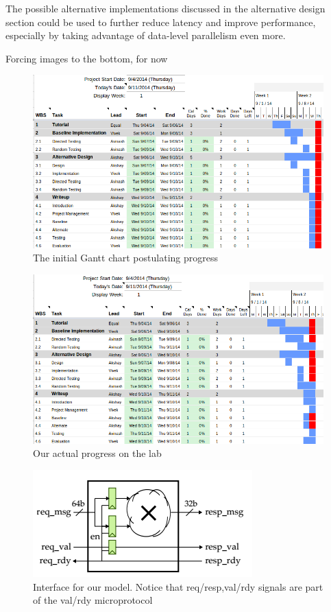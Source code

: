 \documentclass[11pt]{article}
\begin{document}
The possible alternative implementations discussed in the alternative design section could be used to further reduce latency and improve performance, especially by taking advantage of data-level parallelism even more. 


Forcing images to the bottom, for now

\begin{figure}[b]
\centering
\includegraphics[scale=0.5]{gantt}
\caption{The initial Gantt chart postulating progress}
\label{fig:gantt}
\end{figure}

\begin{figure}[b]
\centering
\includegraphics[scale=0.5]{gantt_actual}
\caption{Our actual progress on the lab}
\label{fig:gantt_actual}
\end{figure}

\begin{figure}[b]
\centering
\includegraphics[scale=0.5]{FLmodel}
\caption{Interface for our model. Notice that req/resp,val/rdy signals are part of the val/rdy microprotocol}
\label{fig:model}
\end{figure}
\end{document}

